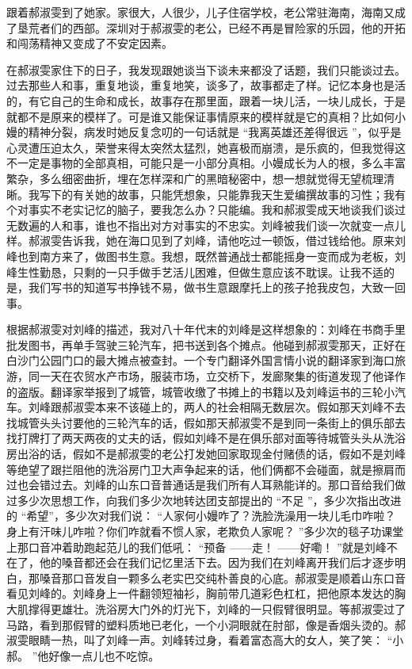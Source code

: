 \documentclass[12pt,twoside,openany]{book}
\begin{document}
跟着郝淑雯到了她家。家很大，人很少，儿子住宿学校，老公常驻海南，海南又成了垦荒者们的西部。深圳对于郝淑雯的老公，已经不再是冒险家的乐园，他的开拓和闯荡精神又变成了不安定因素。

在郝淑雯家住下的日子，我发现跟她谈当下谈未来都没了话题，我们只能谈过去。过去那些人和事，重复地谈，重复地笑，谈多了，故事都走了样。记忆本身也是活的，有它自己的生命和成长，故事存在那里面，跟着一块儿活，一块儿成长，于是就都不是原来的模样了。可是谁又能保证事情原来的模样就是它的真相？比如何小嫚的精神分裂，病发时她反复念叨的一句话就是 “我离英雄还差得很远 ”，似乎是心灵遭压迫太久，荣誉来得太突然太猛烈，她喜极而崩溃，是乐疯的，但我觉得这不一定是事物的全部真相，可能只是一小部分真相。小嫚成长为人的根，多么丰富繁杂，多么细密曲折，埋在怎样深和广的黑暗秘密中，想一想就觉得无望梳理清晰。我写下的有关她的故事，只能凭想象，只能靠我天生爱编撰故事的习性；我有个对事实不老实记忆的脑子，要我怎么办？只能编。我和郝淑雯成天地谈我们谈过无数遍的人和事，谁也不指出对方对事实的不忠实。刘峰被我们谈一次就变一点儿样。郝淑雯告诉我，她在海口见到了刘峰，请他吃过一顿饭，借过钱给他。原来刘峰也到南方来了，做图书生意。我想，既然普通战士都能摇身一变而成为老板，刘峰生性勤恳，只剩的一只手做手艺活儿困难，但做生意应该不耽误。让我不适的是，我们写书的知道写书挣钱不易，做书生意跟摩托上的孩子抢我皮包，大致一回事。

根据郝淑雯对刘峰的描述，我对八十年代末的刘峰是这样想象的：刘峰在书商手里批发图书，再单手驾驶三轮汽车，把书送到各个摊点。他碰到郝淑雯那天，正好在白沙门公园门口的最大摊点被查封。一个专门翻译外国言情小说的翻译家到海口旅游，同一天在农贸水产市场，服装市场，立交桥下，发廊聚集的街道发现了他译作的盗版。翻译家举报到了城管，城管收缴了书摊上的书籍以及刘峰运书的三轮小汽车。刘峰跟郝淑雯本来不该碰上的，两人的社会相隔无数层次。假如那天刘峰不去找城管头头讨要他的三轮汽车的话，假如那天郝淑雯不是到同一条街上的俱乐部去找打牌打了两天两夜的丈夫的话，假如刘峰不是在俱乐部对面等待城管头头从洗浴房出浴的话，假如不是郝淑雯的老公打发她回家取现金付赌债的话，假如不是刘峰等绝望了跟拦阻他的洗浴房门卫大声争起来的话，他们俩都不会碰面，就是擦肩而过也会错过去。刘峰的山东口音普通话是我们所有人耳熟能详的。那口音给我们做过多少次思想工作，向我们多少次地转达团支部提出的 “不足 ”，多少次指出改进的 “希望”，多少次对我们说： “人家何小嫚咋了？洗脸洗澡用一块儿毛巾咋啦？身上有汗味儿咋啦？你们咋就看不惯人家，老欺负人家呢？ ”多少次的毯子功课堂上那口音冲着助跑起范儿的我们低吼： “预备 ——走！ ——好嘞！ ”就是刘峰不在了，他的嗓音都还会在我们记忆里活下去。因为我们在刘峰离开我们后才逐步明白，那嗓音那口音发自一颗多么老实巴交纯朴善良的心底。郝淑雯是顺着山东口音看见刘峰的。刘峰身上一件翻领短袖衫，胸前带几道彩色杠杠，把他原本发达的胸大肌撑得更雄壮。洗浴房大门外的灯光下，刘峰的一只假臂很明显。等郝淑雯过了马路，看到那假臂的塑料质地已老化，一个小洞眼就在肘部，像是香烟头烫的。郝淑雯眼睛一热，叫了刘峰一声。刘峰转过身，看着富态高大的女人，笑了笑： “小郝。 ”他好像一点儿也不吃惊。
\end{document}
